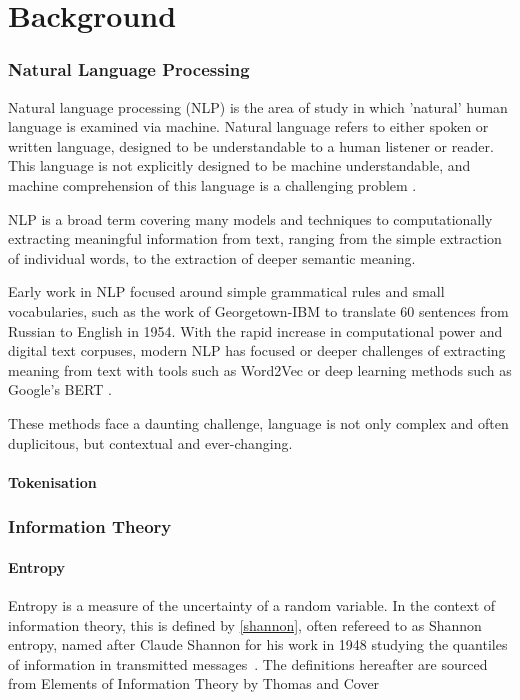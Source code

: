 \chapter{Background \label{ch:background}}

\subsection{Natural Language Processing}

Natural language processing (NLP) is the area of study in which 'natural' human language is examined via machine. Natural language refers to either spoken or written language, designed to be understandable to a human listener or reader. This language is not explicitly designed to be machine understandable, and machine comprehension of this language is a challenging problem .

NLP is a broad term covering many models and techniques to computationally extracting meaningful information from text, ranging from the simple extraction of individual words, to the extraction of deeper semantic meaning. 

Early work in NLP focused around simple grammatical rules and small vocabularies, such as the work of Georgetown-IBM  to translate 60 sentences from Russian to English in 1954. With the rapid increase in computational power and digital text corpuses, modern NLP has focused or deeper challenges of extracting meaning from text with tools such as Word2Vec  or deep learning methods such as Google's BERT .

These methods face a daunting challenge, language is not only complex and often duplicitous, but contextual and ever-changing. 

\subsubsection{Tokenisation} 

\subsection{Information Theory}
\subsubsection{Entropy}
Entropy is a measure of the uncertainty of a random variable. In the context of information theory, this is defined by \autoref{shannon}, often refereed to as Shannon entropy, named after Claude Shannon for his work in 1948 studying the quantiles of information in transmitted messages~. The definitions hereafter are sourced from Elements of Information Theory by Thomas and Cover  

